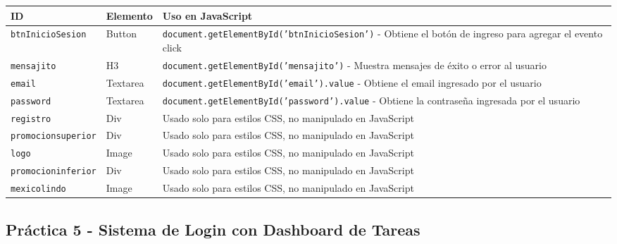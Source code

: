 \documentclass[12pt,a4paper]{article}
\begin{document}
\begin{longtable}{|p{4cm}|p{3cm}|p{8cm}|}
\hline
\rowcolor{lightgray}
\textbf{ID} & \textbf{Elemento} & \textbf{Uso en JavaScript} \\
\hline

\texttt{btnInicioSesion} & Button & \texttt{document.getElementById('btnInicioSesion')} - Obtiene el botón de ingreso para agregar el evento click \\
\hline

\texttt{mensajito} & H3 & \texttt{document.getElementById('mensajito')} - Muestra mensajes de éxito o error al usuario \\
\hline

\texttt{email} & Textarea & \texttt{document.getElementById('email').value} - Obtiene el email ingresado por el usuario \\
\hline

\texttt{password} & Textarea & \texttt{document.getElementById('password').value} - Obtiene la contraseña ingresada por el usuario \\
\hline

\texttt{registro} & Div & Usado solo para estilos CSS, no manipulado en JavaScript \\
\hline

\texttt{promocionsuperior} & Div & Usado solo para estilos CSS, no manipulado en JavaScript \\
\hline

\texttt{logo} & Image & Usado solo para estilos CSS, no manipulado en JavaScript \\
\hline

\texttt{promocioninferior} & Div & Usado solo para estilos CSS, no manipulado en JavaScript \\
\hline

\texttt{mexicolindo} & Image & Usado solo para estilos CSS, no manipulado en JavaScript \\
\hline

\end{longtable}

\clearpage

\subsection{Práctica 5 - Sistema de Login con Dashboard de Tareas}
\end{document}
